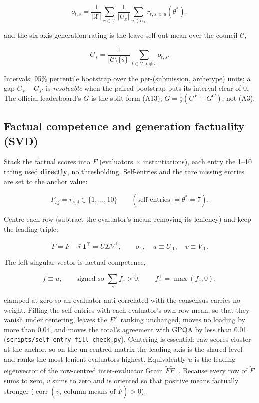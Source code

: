 \documentclass{article}
\begin{document}
\[ o_{t,s}=\frac{1}{|\mathcal{X}|}\sum_{x\in\mathcal{X}}\frac{1}{|U_x|}\sum_{u\in U_x} r_{t,s,x,u}(\theta^{*}), \tag{A2}\]

and the six-axis generation rating is the leave-self-out mean over the council \(\mathcal{C}\),

\[ G_s=\frac{1}{|\mathcal{C}\setminus\{s\}|}\sum_{t\in\mathcal{C},\,t\ne s} o_{t,s}. \tag{A3}\]

Intervals: 95\% percentile bootstrap over the per-(submission, archetype) units; a gap \(G_s-G_{s'}\) is \emph{resolvable} when the paired bootstrap puts its interval clear of 0. The official leaderboard's \(G\) is the split form (A13), \(G=\tfrac12(G^{F}+G^{C})\), not (A3).

\subsection{Factual competence and generation factuality (SVD)}\label{factual-competence-and-generation-factuality-svd}

Stack the factual scores into \(F\) (evaluators \ensuremath{\times} instantiations), each entry the 1--10 rating used \textbf{directly}, no thresholding. Self-entries and the rare missing entries are set to the anchor value:

\[ F_{sj}=r_{s,j}\in\{1,\dots,10\}\qquad(\text{self-entries }=\theta^{*}=7). \tag{A5}\]

Centre each row (subtract the evaluator's mean, removing its leniency) and keep the leading triple:

\[ \tilde F = F-\bar r\,\mathbf 1^{\top}=U\Sigma V^{\top},\qquad \sigma_1,\quad u\equiv U_{\cdot 1},\quad v\equiv V_{\cdot 1}. \tag{A6}\]

The left singular vector is factual competence,

\[ f\equiv u,\qquad \text{signed so } \textstyle\sum_s f_s>0,\qquad f^{+}_s=\max(f_s,0), \tag{A7}\]

clamped at zero so an evaluator anti-correlated with the consensus carries no weight. Filling the self-entries with each evaluator's own row mean, so that they vanish under centering, leaves the \(E^{F}\) ranking unchanged, moves no loading by more than 0.04, and moves the total's agreement with GPQA by less than 0.01 (\texttt{scripts/self\_\allowbreak{}entry\_\allowbreak{}fill\_\allowbreak{}check.py}). Centering is essential: raw scores cluster at the anchor, so on the un-centred matrix the leading axis is the shared level and ranks the most lenient evaluators highest. Equivalently \(u\) is the leading eigenvector of the row-centred inter-evaluator Gram \(\tilde F\tilde F^{\top}\). Because every row of \(\tilde F\) sums to zero, \(v\) sums to zero and is oriented so that positive means factually stronger (\(\operatorname{corr}(v,\ \text{column means of }\tilde F)>0\)).
\end{document}
